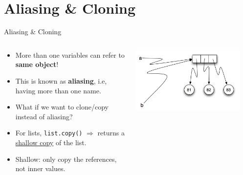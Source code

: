   \section{Aliasing \& Cloning}
    \begin{frame}{Aliasing \& Cloning}
        \Large
        \begin{columns}
            \begin{column}[c]{0.6\textwidth}
                \begin{itemize}
                    \item More than one variables can refer to \textbf{same object}!
                    \item This is known as \textbf{aliasing}, i.e, having more than one name.
                    \item What if we want to clone/copy instead of aliasing?
                    \item For lists, \texttt{list.copy()} $\Rightarrow$ returns a \underline{shallow copy} of the list.
                    \item Shallow: only copy the references, not inner values.
                \end{itemize}
            \end{column}
            \begin{column}[c]{0.4\textwidth}
                \includegraphics[width=0.9\textwidth]{images/aliasing.png}
            \end{column}
        \end{columns}
    \end{frame}

